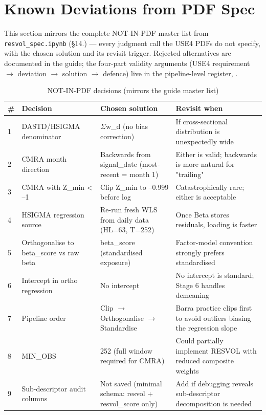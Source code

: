\documentclass[11pt,a4paper]{article}
\begin{document}
\section{Known Deviations from PDF Spec}

This section mirrors the complete NOT-IN-PDF master list from
\texttt{resvol\_spec.ipynb} (\S14.) --- every judgment call the USE4 PDFs do not
specify, with the chosen solution and its revisit trigger. Rejected alternatives
are documented in the guide; the four-part validity arguments (USE4 requirement
$\to$ deviation $\to$ solution $\to$ defence) live in the pipeline-level
register, .

\begin{longtable}{@{}p{0.5cm}p{3.6cm}p{6.0cm}p{3.8cm}@{}}
\caption{NOT-IN-PDF decisions (mirrors the guide master list)}\\
\toprule
\textbf{\#} & \textbf{Decision} & \textbf{Chosen solution} & \textbf{Revisit when} \\
\midrule
\endhead
1 & DASTD/HSIGMA denominator & $\Sigma$w\_d (no bias correction) & If cross-sectional distribution is unexpectedly wide \\[3pt]
2 & CMRA month direction & Backwards from signal\_date (most-recent = month 1) & Either is valid; backwards is more natural for "trailing" \\[3pt]
3 & CMRA with Z\_min < --1 & Clip Z\_min to --0.999 before log & Catastrophically rare; either is acceptable \\[3pt]
4 & HSIGMA regression source & Re-run fresh WLS from daily data (HL=63, T=252) & Once Beta stores residuals, loading is faster \\[3pt]
5 & Orthogonalise to beta\_score vs raw beta & beta\_score (standardised exposure) & Factor-model convention strongly prefers standardised \\[3pt]
6 & Intercept in ortho regression & No intercept & No intercept is standard; Stage 6 handles demeaning \\[3pt]
7 & Pipeline order & Clip $\to$ Orthogonalise $\to$ Standardise & Barra practice clips first to avoid outliers biasing the regression slope \\[3pt]
8 & MIN\_OBS & 252 (full window required for CMRA) & Could partially implement RESVOL with reduced composite weights \\[3pt]
9 & Sub-descriptor audit columns & Not saved (minimal schema: resvol + resvol\_score only) & Add if debugging reveals sub-descriptor decomposition is needed \\[3pt]
\bottomrule
\end{longtable}
\end{document}
